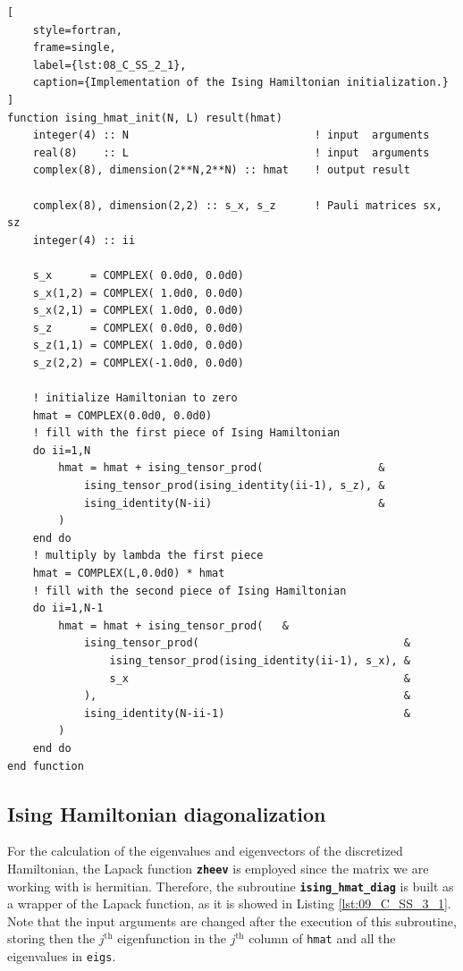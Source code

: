 \documentclass[pra, onecolumn, notitlepage, floats, 11pt]{revtex4-1}
\newcommand{\codebold}[2][cobalt]{\texttt{\bfseries {\color{#1}#2}}}
\newcommand{\code}[2][black]{\color{#1}\texttt{#2}}
\begin{document}
\begin{lstlisting}[
    style=fortran,
    frame=single,
    label={lst:08_C_SS_2_1},
    caption={Implementation of the Ising Hamiltonian initialization.}
]
function ising_hmat_init(N, L) result(hmat)
    integer(4) :: N                             ! input  arguments
    real(8)    :: L                             ! input  arguments
    complex(8), dimension(2**N,2**N) :: hmat    ! output result

    complex(8), dimension(2,2) :: s_x, s_z      ! Pauli matrices sx, sz
    integer(4) :: ii

    s_x      = COMPLEX( 0.0d0, 0.0d0)
    s_x(1,2) = COMPLEX( 1.0d0, 0.0d0)
    s_x(2,1) = COMPLEX( 1.0d0, 0.0d0)
    s_z      = COMPLEX( 0.0d0, 0.0d0)
    s_z(1,1) = COMPLEX( 1.0d0, 0.0d0)
    s_z(2,2) = COMPLEX(-1.0d0, 0.0d0)

    ! initialize Hamiltonian to zero
    hmat = COMPLEX(0.0d0, 0.0d0)
    ! fill with the first piece of Ising Hamiltonian
    do ii=1,N
        hmat = hmat + ising_tensor_prod(                  &
            ising_tensor_prod(ising_identity(ii-1), s_z), &
            ising_identity(N-ii)                          &
        )
    end do
    ! multiply by lambda the first piece
    hmat = COMPLEX(L,0.0d0) * hmat
    ! fill with the second piece of Ising Hamiltonian
    do ii=1,N-1
        hmat = hmat + ising_tensor_prod(   &
            ising_tensor_prod(                                &
                ising_tensor_prod(ising_identity(ii-1), s_x), &
                s_x                                           &
            ),                                                &
            ising_identity(N-ii-1)                            &
        )
    end do
end function
\end{lstlisting}



\subsection{Ising Hamiltonian diagonalization}
For the calculation of the eigenvalues and eigenvectors of the discretized Hamiltonian, the Lapack function \codebold[black]{zheev} is employed since the matrix we are working with is hermitian. Therefore, the subroutine \codebold[black]{ising\_hmat\_diag} is built as a wrapper of the Lapack function, as it is showed in Listing \ref{lst:09_C_SS_3_1}. Note that the input arguments are changed after the execution of this subroutine, storing then the \( j^{\text{th}} \) eigenfunction in the \( j^{\text{th}} \) column of \code{hmat} and all the eigenvalues in \code{eigs}.
\end{document}
